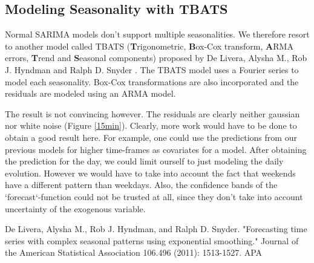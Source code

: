 \documentclass[conference]{IEEEtran}
\begin{document}
\subsection{Modeling Seasonality with TBATS}
Normal SARIMA models don’t support multiple seasonalities. We therefore resort to another model called TBATS (\textbf{T}rigonometric, \textbf{B}ox-Cox transform, \textbf{A}RMA errors, \textbf{T}rend and \textbf{S}easonal components) proposed by De Livera, Alysha M., Rob J. Hyndman and Ralph D. Snyder \cite{TBATS_paper}. The TBATS model uses a Fourier series to model each seasonality. Box-Cox transformations are also incorporated and the residuals are modeled using an ARMA model.
\par
The result is not convincing however. The residuals are clearly neither gaussian nor white noise (Figure \ref{15min}). Clearly, more work would have to be done to obtain a good result here. For example, one could use the predictions from our previous models for higher time-frames as covariates for a model. After obtaining the prediction for the day, we could limit ourself to just modeling the daily evolution. However we would have to take into account the fact that weekends have a different pattern than weekdays. Also, the confidence bands  of the `forecast`-function could not be trusted at all, since they don’t take into account uncertainty of the exogenous variable.

\begin{thebibliography}{00}

De Livera, Alysha M., Rob J. Hyndman, and Ralph D. Snyder. "Forecasting time series with complex seasonal patterns using exponential smoothing." Journal of the American Statistical Association 106.496 (2011): 1513-1527.
APA	

\end{thebibliography}
\end{document}
